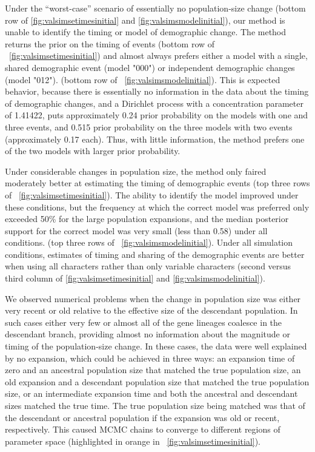 Under the ``worst-case'' scenario of essentially no population-size change
(bottom row of \figs \ref{fig:valsimsetimesinitial} and
\ref{fig:valsimsmodelinitial}), our method is unable to identify the timing or
model of demographic change.
The method returns the prior on the timing of events 
(bottom row of \fig{}~\ref{fig:valsimsetimesinitial})
and almost always prefers either a model with a single, shared demographic
event (model "000") or independent demographic changes (model "012").
(bottom row of \fig{}~\ref{fig:valsimsmodelinitial}).
This is expected behavior, because there is essentially no information in the
data about the timing of demographic changes, and a Dirichlet process with a
concentration parameter of 1.41422, puts approximately 0.24 prior probability
on the models with one and three events, and 0.515 prior probability on the
three models with two events (approximately 0.17 each).
Thus, with little information, the method prefers one of the two models with
larger prior probability.

Under considerable changes in population size, the method only faired
moderately better at estimating the timing of demographic events
(top three rows of \fig{}~\ref{fig:valsimsetimesinitial}).
The ability to identify the model improved under these
conditions, but the frequency at which the correct model
was preferred only exceeded 50\% for the large population
expansions, and the median posterior support for the correct
model was very small (less than 0.58) under all conditions.
(top three rows of \fig{}~\ref{fig:valsimsmodelinitial}).
Under all simulation conditions, estimates of timing and sharing
of the demographic events are better when using all characters
rather than only variable characters
(second versus third column of \figs
\ref{fig:valsimsetimesinitial}
and
\ref{fig:valsimsmodelinitial}).


We observed numerical problems when the change in population size was
either very recent or old relative to the effective size of the descendant
population.
In such cases either very few or almost all of the gene lineages coalesce in
the descendant branch, providing almost no information about the magnitude or
timing of the population-size change.
In these cases, the data were well explained by no expansion, which could be
achieved in three ways: an expansion time of zero and an ancestral population
size that matched the true population size, an old expansion and a
descendant population size that matched the true population size, or an
intermediate expansion time and both the ancestral and descendant sizes matched the
true time.
The true population size being matched was that of the descendant or ancestral
population if the expansion was old or recent, respectively.
This caused MCMC chains to converge to different regions of parameter
space
(highlighted in orange in \fig{}~\ref{fig:valsimsetimesinitial}).

